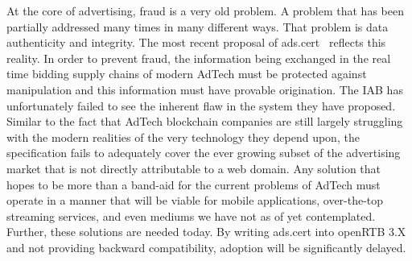 At the core of advertising, fraud is a very old problem.
A problem that has been partially addressed many times in many
different ways.
That problem is data authenticity and integrity.
The most recent proposal of ads.cert~\cite{AdsDCert} reflects this reality.
In order to prevent fraud, the information being exchanged in the real
time bidding supply chains of modern AdTech must be protected against
manipulation and this information must have provable origination.
The IAB has unfortunately failed to see the inherent flaw in the system
they have proposed.
Similar to the fact that AdTech blockchain companies are still largely
struggling with the modern realities of the very technology they depend
upon, the specification fails to adequately
cover the ever growing subset of the advertising market that is not
directly attributable to a web domain.
Any solution that hopes to be more than a band-aid for the current
problems of AdTech must operate in a manner that will be viable for
mobile applications, over-the-top streaming services, and even mediums
we have not as of yet contemplated.
Further, these solutions are needed today.
By writing ads.cert into openRTB 3.X and not providing backward
compatibility, adoption will be significantly delayed.
